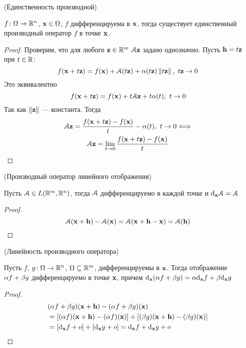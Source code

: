 \begin{theorem}(Единственность производной)

    $f \colon \O \to \Rn$, $\x \in \O$, $f$ дифференцируема в $\x$, тогда
    существует единственный производный оператор $f$ в точке $\x$.
\end{theorem}
\begin{proof}
    Проверим, что для любого $\z \in \Rm~ \cA \z$ задано однозначно.
     Пусть $\h = t\z$ при $t \in \R$:
\[
    f(\x + t \z) = f(\x) + \cA(t \z) + \a(t\z) \norm{t\z},~ t\z \to 0
\]
    Это эквивалентно
\[
    f(\x + t \z) = f(\x) + t\cA \z + t\a(t),~ t \to 0
\]
    Так как $\norm{\z}$ --- константа. Тогда
\begin{gather*}
    \cA\z = \frac{f(\x + t \z) - f(\x)}{t} - \a(t),~ t \to 0 \Llra \\
    \cA\z = \lim_{t \to 0}{\frac{f(\x + t \z) - f(\x)}{t}}
\end{gather*}
\end{proof}

\begin{proposition}(Производный оператор линейного отображения)

    Пусть $\cA \in L(\Rm, \Rn)$, тогда $\cA$ дифференцируемо в каждой точке и
    $\der{\cA}{\x} = \cA$
\end{proposition}
\begin{proof}
\[
    \cA(\x + \h) - \cA(\x) = \cA(\x + \h - \x) = \cA(\h)
\]
\end{proof}

\begin{proposition}(Линейность производного оператора)

    Пусть $f$, $g \colon \O \to \Rn$, $\O \subseteq \Rm$, дифференцируемы в
    $\x$. Тогда отображение $\a f + \b g$ дифференцируемо в точке $\x$, причем
    $\der{(\a f + \b g)}{\x} = \a \der{f}{\x} + \b \der{g}{\x}$
\end{proposition}
\begin{proof}
\begin{align*}
    &(\a f + \b g)(\x + \h) - (\a f + \b g)(\x) \\
    &= [(\a f)(\x + \h) - (\a f)(\x)] + [(\b g)(\x + \h) - (\b g)(\x)] \\
    &= [\der{f}{\x} + o] + [\der{g}{\x} + o] = \der{f}{\x} + \der{g}{\x} + o
\end{align*}
\end{proof}

